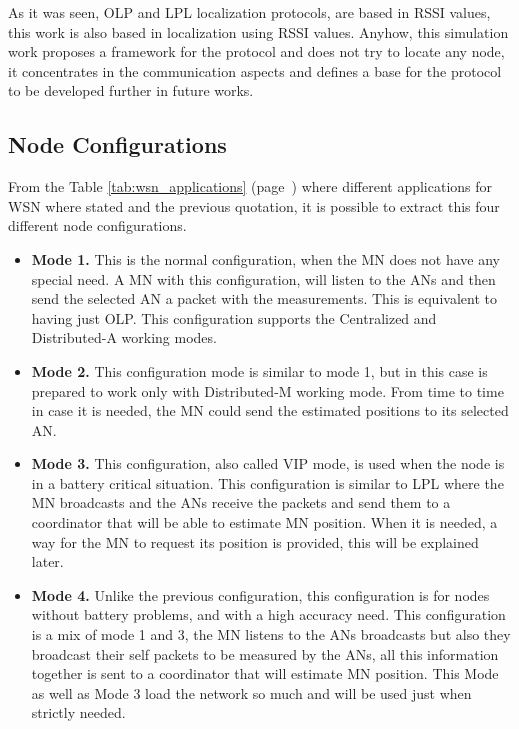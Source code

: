 As it was seen, \ac{OLP} and \ac{LPL} localization protocols, are based in \ac{RSSI} values, this work is also based in localization using 
\ac{RSSI} values. Anyhow, this simulation work proposes a framework for the protocol and does not try to locate any node, it concentrates
in the communication aspects and defines a base for the protocol to be developed further in future works.


\subsection{Node Configurations}

From the Table \ref{tab:wsn_applications} (page~\pageref{tab:wsn_applications}) where different applications for \ac{WSN} where stated and the
previous quotation, it is possible to extract this four different node configurations.

\begin{itemize}
 \item \textbf{Mode 1.} This is the normal configuration, when the \ac{MN} does not have any special need. A \ac{MN} with this configuration,
will listen to the \acp{AN} and then send the selected \ac{AN} a packet with the measurements. This is equivalent to having just \ac{OLP}. This
configuration supports the Centralized and Distributed-A working modes.
 \item \textbf{Mode 2.} This configuration mode is similar to mode 1, but in this case is prepared to work only with Distributed-M working mode.
From time to time in case it is needed, the \ac{MN} could send the estimated positions to its selected \ac{AN}.
 \item \textbf{Mode 3.} This configuration, also called \ac{VIP} mode, is used when the node is in a battery critical situation.
This configuration is similar to \ac{LPL} where the \ac{MN} broadcasts and the \acp{AN} receive the packets and send them to a coordinator that
will be able to estimate \ac{MN} position. When it is needed, a way for the \ac{MN} to request its position is provided, this will be explained 
later. 
 \item \textbf{Mode 4.} Unlike the previous configuration, this configuration is for nodes without battery problems, and with a high accuracy
need. This configuration is a mix of mode 1 and 3, the \ac{MN} listens to the \acp{AN} broadcasts but also they broadcast their
self packets to be measured by the \acp{AN}, all this information together is sent to a coordinator that will estimate \ac{MN} position.
This Mode as well as Mode 3 load the network so much and will be used just when strictly needed.
\end{itemize}

